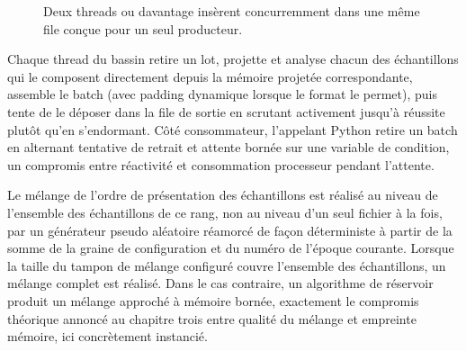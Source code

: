 \documentclass[12pt,a4paper]{report}
\begin{document}
\begin{figure}[htbp]
\centering
{}
\caption{Deux threads ou davantage insèrent concurremment dans une même file conçue pour un seul producteur.}
\label{fig:async_arch}
\end{figure}

Chaque thread du bassin retire un lot, projette et analyse chacun des échantillons qui le composent directement depuis la mémoire projetée correspondante, assemble le batch (avec padding dynamique lorsque le format le permet), puis tente de le déposer dans la file de sortie en scrutant activement jusqu'à réussite plutôt qu'en s'endormant. Côté consommateur, l'appelant Python retire un batch en alternant tentative de retrait et attente bornée sur une variable de condition, un compromis entre réactivité et consommation processeur pendant l'attente.

Le mélange de l'ordre de présentation des échantillons est réalisé au niveau de l'ensemble des échantillons de ce rang, non au niveau d'un seul fichier à la fois, par un générateur pseudo aléatoire réamorcé de façon déterministe à partir de la somme de la graine de configuration et du numéro de l'époque courante. Lorsque la taille du tampon de mélange configuré couvre l'ensemble des échantillons, un mélange complet est réalisé. Dans le cas contraire, un algorithme de réservoir produit un mélange approché à mémoire bornée, exactement le compromis théorique annoncé au chapitre trois entre qualité du mélange et empreinte mémoire, ici concrètement instancié.
\end{document}

